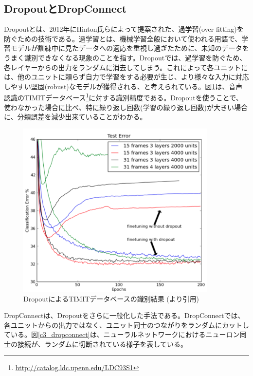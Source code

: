\subsection{DropoutとDropConnect}
\label{c3_dropout}
Dropoutとは、2012年にHinton氏らによって提案された、過学習(over fitting)を防ぐための技術である\cite{hinton2012improving}。過学習とは、機械学習全般において使われる用語で、学習モデルが訓練中に見たデータへの適応を重視し過ぎたために、未知のデータをうまく識別できなくなる現象のことを指す。Dropoutでは、過学習を防ぐため、各レイヤーからの出力をランダムに消去してしまう。これによって各ユニットには、他のユニットに頼らず自力で学習をする必要が生じ、より様々な入力に対応しやすい堅固(robust)なモデルが獲得される、と考えられている。図\ref{c3_dropout_timit}は、音声認識のTIMITデータベース\cite{fisher1986the-darpa}\footnote{\url{http://catalog.ldc.upenn.edu/LDC93S1}}に対する識別精度である。Dropoutを使うことで、使わなかった場合に比べ、特に繰り返し回数(学習の繰り返し回数)が大きい場合に、分類誤差を減少出来ていることがわかる。
\begin{figure}[tbp]
 \centering
  \includegraphics[width=100mm]{img/c3/dropout_timit}
 \caption{DropoutによるTIMITデータベースの識別結果 (\cite{hinton2012improving}より引用)}
 \label{c3_dropout_timit}
\end{figure}
\par
DropConnectは、Dropoutをさらに一般化した手法である。DropConnectでは、各ユニットからの出力ではなく、ユニット同士のつながりをランダムにカットしている。図\ref{c3_dropconnect}は、ニューラルネットワークにおけるニューロン同士の接続が、ランダムに切断されている様子を表している。

